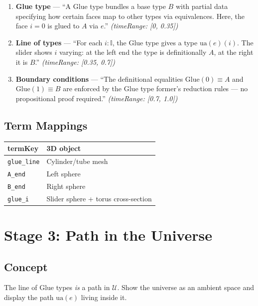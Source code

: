 \documentclass[11pt,a4paper]{article}
\begin{document}
\begin{enumerate}
  \item \textbf{Glue type} — ``A Glue type bundles a base type $B$ with partial
    data specifying how certain faces map to other types via equivalences.
    Here, the face $i{=}0$ is glued to $A$ via $e$.''
    \textit{(timeRange: [0, 0.35])}
  \item \textbf{Line of types} — ``For each $i : \mathbb{I}$, the Glue type gives
    a type $\mathrm{ua}(e)(i)$.  The slider shows $i$ varying: at the left end
    the type is definitionally $A$, at the right it is $B$.''
    \textit{(timeRange: [0.35, 0.7])}
  \item \textbf{Boundary conditions} — ``The definitional equalities
    $\mathrm{Glue}(0) \equiv A$ and $\mathrm{Glue}(1) \equiv B$ are enforced by
    the Glue type former's reduction rules — no propositional proof required.''
    \textit{(timeRange: [0.7, 1.0])}
\end{enumerate}

\subsection{Term Mappings}
\begin{center}
\begin{tabular}{ll}
\toprule \textbf{termKey} & \textbf{3D object} \\\midrule
\texttt{glue\_line} & Cylinder/tube mesh \\
\texttt{A\_end} & Left sphere \\
\texttt{B\_end} & Right sphere \\
\texttt{glue\_i} & Slider sphere + torus cross-section \\
\bottomrule
\end{tabular}
\end{center}

\section{Stage 3: Path in the Universe}

\subsection{Concept}

The line of Glue types \emph{is} a path in $\mathcal{U}$.  Show the universe as
an ambient space and display the path $\mathrm{ua}(e)$ living inside it.
\end{document}
